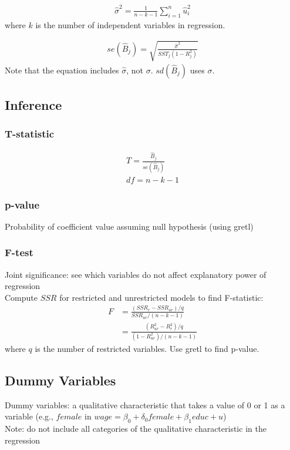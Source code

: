 \documentclass[12pt]{article}
\numberwithin{equation}{section}
\begin{document}
\begin{gather}
    \hat{\sigma}^2 = \frac{1}{n-k-1} \sum_{i=1}^{n} \hat{u}_i^2
\end{gather}
where $k$ is the number of independent variables in regression.

\begin{gather}
    se(\hat{B}_j) = \sqrt{\frac{\hat{\sigma}^2}{SST_j(1-R_j^2)}}
\end{gather}
Note that the equation includes $\hat{\sigma}$, not $\sigma$. $sd(\hat{B}_j)$ uses $\sigma$.

\subsection{Inference}

\subsubsection{T-statistic}
\begin{gather}
    T = \frac{\hat{B}_j}{se(\hat{B}_j)} \\
    df = n-k-1
\end{gather}

\subsubsection{p-value}
Probability of coefficient value assuming null hypothesis (using gretl)

\subsubsection{F-test}
Joint significance: see which variables do not affect explanatory power of regression \\[0.5cm]
Compute $SSR$ for restricted and unrestricted models to find F-statistic:
\begin{align}
    F &= \frac{(SSR_r - SSR_{ur})/q}{SSR_{ur}/(n-k-1)} \\
    &= \frac{(R_{ur}^2 - R_{r}^2)/q}{(1-R_{ur}^2)/(n-k-1)}
\end{align}
where $q$ is the number of restricted variables. Use gretl to find p-value.


\subsection{Dummy Variables}
Dummy variables: a qualitative characteristic that takes a value of 0 or 1 as a variable (e.g., $female$ in $wage = \beta_0 + \delta_0  female + \beta_1 educ + u$) \\[0.5cm]
Note: do not include all categories of the qualitative characteristic in the regression
\end{document}
